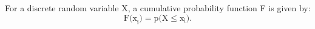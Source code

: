For a discrete random variable X, a cumulative probability
function F is given by:
\[ \mathrm{F(x}_{\mathrm{i}} ) = \mathrm{p(X} \leq \mathrm{x}_{\mathrm{i}} ) . \]
